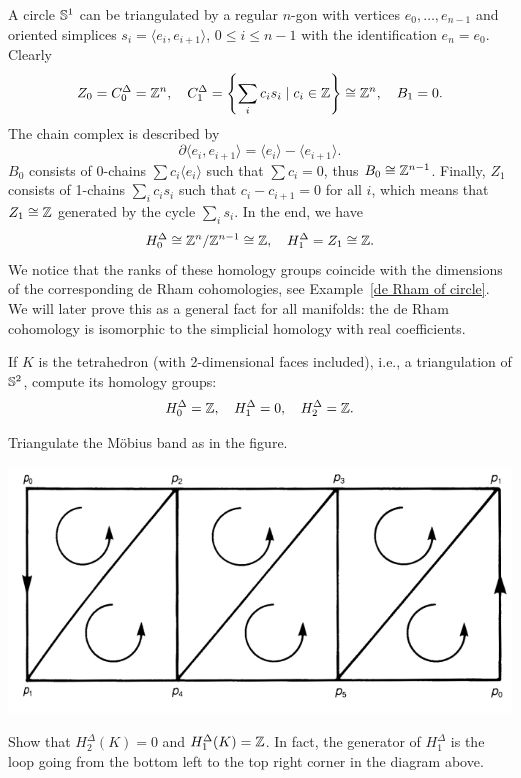 \begin{example}
    A circle $\mathbb{S}^1$ can be triangulated by a regular $n$-gon with vertices  $e_0,\ldots,e_{n-1}$ and oriented simplices $s_i=\langle e_i,e_{i+1}\rangle$, $0\leq i\leq n-1$ with the identification $e_n=e_0$. 
    Clearly 
    \[Z_0=C^\Delta_0=\mathbb{Z}^n,\quad C^\Delta_1=\left\{\sum_i c_i s_i \mid c_i\in \mathbb{Z}\right\}\cong \mathbb{Z}^n,\quad B_1=0.\]
    The chain complex is described by 
    \[\partial\langle e_i,e_{i+1}\rangle=\langle e_i\rangle-\langle e_{i+1}\rangle .\]
    $B_0$ consists of 0-chains $\sum c_i \langle e_i\rangle$ such that $\sum c_i=0$, thus $B_0\cong \mathbb{Z}^{n-1}$.
    Finally, $Z_1$ consists of 1-chains $\sum_i c_i s_i$ such that $c_i-c_{i+1}=0$ for all $i$, which means that $Z_1\cong \mathbb{Z}$ generated by the cycle $\sum_i s_i$. In the end, we have
    \[H^\Delta_0\cong \mathbb{Z}^n/\mathbb{Z}^{n-1}\cong \mathbb{Z},\quad H^\Delta_1=Z_1\cong \mathbb{Z}. \]
    We notice that the ranks of these homology groups coincide with the dimensions of the corresponding de Rham cohomologies, see Example~\ref{de Rham of circle}. We will later prove this as a general fact for all manifolds: the de Rham cohomology is isomorphic to the simplicial homology with real coefficients.
\end{example}


\begin{xca}
    If $K$ is the tetrahedron (with 2-dimensional faces included), i.e., a triangulation of $\mathbb{S}^2$, compute its homology groups:
    \[H^\Delta_0=\mathbb{Z},\quad H^\Delta_1=0,\quad H^\Delta_2=\mathbb{Z}.\]
\end{xca}
\begin{xca}
    Triangulate the M\"obius band as in the figure.
    \begin{center}
        \includegraphics[scale=0.2]{figures/mobius.png}
    \end{center}
    Show that $H^\Delta_2(K)=0$ and $H^\Delta_1(K)=\mathbb{Z}$. In fact, the generator of $H^\Delta_1$ is the loop going from the bottom left to the top right corner in the diagram above.
\end{xca}

